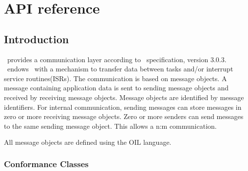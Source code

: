 
\chapter{API reference}
\label{sec:api_reference}

\section{Introduction}
\ee\ provides a communication layer according to \oc\ specification, version 3.0.3. \oc\ endows \ee\ with a mechanism to transfer data between tasks and/or interrupt service routines(ISRs). The communication is based on message objects. A message containing application data is sent to sending message objects and received by receiving message objects.  Message objects are identified by message identifiers. For internal communication, sending messages can store messages in zero or more receiving message objects. Zero or more senders can send messages to the same sending message object. This allows a n:m communication.

All message objects are defined using the OIL language.    




\subsection{Conformance Classes}




